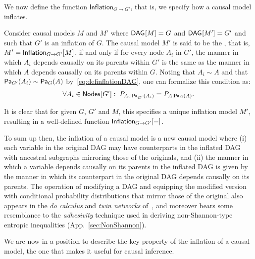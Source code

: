 We now define the function $\mathsf{Inflation}_{G\to G'}$, that is, we specify how a causal model inflates.

\begin{definition}
\label{def:inflat}
Consider causal models $M$ and $M'$ where $\SmallNamedFunction{DAG}{M}=G$ and $\SmallNamedFunction{DAG}{M'}=G'$ and such that $G'$ is an inflation of $G$.   The causal model $M'$ is said to be the {\em {}}, that is, $M' = \SmallNamedFunction[G\to G']{Inflation}{M}$,  if and only if for every node $A_i$ in $G'$, the manner in which $A_i$ depends causally on its parents within $G'$ is the same as the manner in which $A$ depends causally on its parents within $G$.  Noting that $A_i \sim A$ and that $\Pa[G']{A_i} \sim \Pa[G]{A}$ by~\cref{eq:definflationDAG}, one can formalize this condition as:
\begin{align}\label{eq:funcdependences}
 \forall A_i \in \SmallNamedFunction{Nodes}{G'}:\; \pfunc{A_i| \Pa[G']{A_i}}=\pfunc{A|\Pa[G]{A}}.
\end{align}
\end{definition}

It is clear that for given $G$, $G'$ and $M$, this specifies a unique inflation model $M'$, resulting in a well-defined function $\SmallNamedFunction[G\to G']{Inflation}{-}$.

To sum up then, the inflation of a causal model is a new causal model where (i) each variable in the original DAG may have counterparts in the inflated DAG with ancestral subgraphs mirroring those of the originals, and (ii) the manner in which a variable depends causally on its parents in the inflated DAG is given by the manner in which its counterpart in the original DAG depends causally on its parents. The operation of modifying a DAG and equipping the modified version with conditional probability distributions that mirror those of the original also appears in the \emph{do calculus} and \emph{twin networks} of~\citet{pearl2009causality}, and moreover bears some resemblance to the \emph{adhesivity} technique used in deriving non-Shannon-type entropic inequalities (App.~\ref{sec:NonShannon}).

We are now in a position to describe the key property of the inflation of a causal model, the one that makes it useful for causal inference. 

